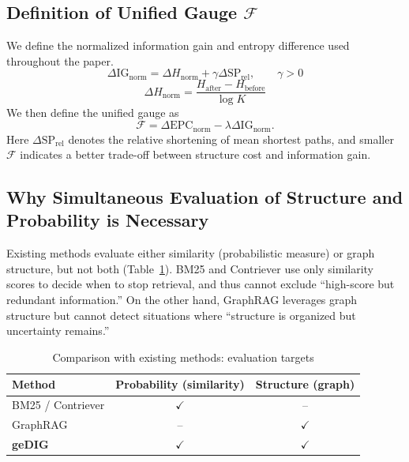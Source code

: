 \documentclass[12pt]{article}
\newcommand{\F}{\mathcal{F}}
\newcommand{\gednorm}{\Delta\mathrm{EPC}_{\mathrm{norm}}}
\newcommand{\ignorm}{\Delta\mathrm{IG}_{\mathrm{norm}}}
\begin{document}
\subsection{Definition of Unified Gauge \texorpdfstring{$\F$}{F}}
\label{sec:gauge_theory}
We define the normalized information gain and entropy difference used throughout the paper.
\begin{equation}
  \ignorm = \Delta H_{\mathrm{norm}} + \gamma \Delta \mathrm{SP}_{\mathrm{rel}},\qquad \gamma>0
  \label{eq:ignorm_main}
\end{equation}
\begin{equation}
  \Delta H_{\mathrm{norm}} = \frac{H_{\text{after}} - H_{\text{before}}}{\log K}
  \label{eq:dh_norm}
\end{equation}
We then define the unified gauge as
\begin{equation}
  \F = \gednorm - \lambda \ignorm.
  \label{eq:f_main}
\end{equation}
Here $\Delta \mathrm{SP}_{\mathrm{rel}}$ denotes the relative shortening of mean shortest paths, and smaller $\F$ indicates a better trade-off between structure cost and information gain.

\subsection{Why Simultaneous Evaluation of Structure and Probability is Necessary}\label{sec:why_both}

Existing methods evaluate either similarity (probabilistic measure) or graph structure, but not both (Table~\ref{tab:structure_probability_comparison}).
BM25 and Contriever use only similarity scores to decide when to stop retrieval, and thus cannot exclude ``high-score but redundant information.''
On the other hand, GraphRAG leverages graph structure but cannot detect situations where ``structure is organized but uncertainty remains.''

\begin{table}[t]
\centering
\caption{Comparison with existing methods: evaluation targets}
\label{tab:structure_probability_comparison}
\small
\begin{tabular}{lcc}
\toprule
Method & Probability (similarity) & Structure (graph) \\
\midrule
BM25 / Contriever & $\checkmark$ & -- \\
GraphRAG & -- & $\checkmark$ \\
\textbf{geDIG} & $\checkmark$ & $\checkmark$ \\
\bottomrule
\end{tabular}
\end{table}
\end{document}
